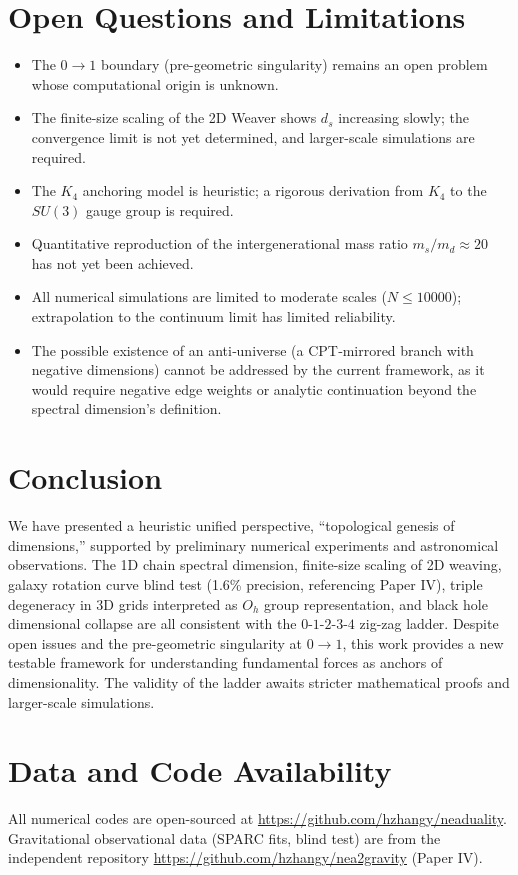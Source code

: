 \documentclass[12pt,a4paper]{article}
\begin{document}
\section{Open Questions and Limitations}
\begin{itemize}
    \item The $0\to1$ boundary (pre-geometric singularity) remains an open problem whose computational origin is unknown.
    \item The finite-size scaling of the 2D Weaver shows $d_s$ increasing slowly; the convergence limit is not yet determined, and larger-scale simulations are required.
    \item The $K_4$ anchoring model is heuristic; a rigorous derivation from $K_4$ to the $SU(3)$ gauge group is required.
    \item Quantitative reproduction of the intergenerational mass ratio $m_s/m_d\approx20$ has not yet been achieved.
    \item All numerical simulations are limited to moderate scales ($N\leq10000$); extrapolation to the continuum limit has limited reliability.
    \item The possible existence of an anti‑universe (a CPT‑mirrored branch with negative dimensions) cannot be addressed by the current framework, as it would require negative edge weights or analytic continuation beyond the spectral dimension’s definition.
\end{itemize}

\section{Conclusion}
We have presented a heuristic unified perspective, ``topological genesis of dimensions,'' supported by preliminary numerical experiments and astronomical observations. The 1D chain spectral dimension, finite-size scaling of 2D weaving, galaxy rotation curve blind test (1.6\% precision, referencing Paper IV), triple degeneracy in 3D grids interpreted as $O_h$ group representation, and black hole dimensional collapse are all consistent with the $0$-$1$-$2$-$3$-$4$ zig-zag ladder. Despite open issues and the pre-geometric singularity at $0\to1$, this work provides a new testable framework for understanding fundamental forces as anchors of dimensionality. The validity of the ladder awaits stricter mathematical proofs and larger-scale simulations.

\section*{Data and Code Availability}
All numerical codes are open-sourced at \url{https://github.com/hzhangy/neaduality}. Gravitational observational data (SPARC fits, blind test) are from the independent repository \url{https://github.com/hzhangy/nea2gravity} (Paper IV).
\end{document}
